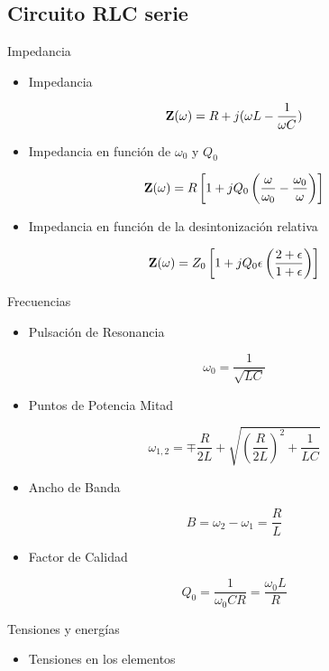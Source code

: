 \subsection{Circuito RLC serie}
\label{sec:org3edc28d}
{Impedancia}

\begin{itemize}
\item Impedancia
\end{itemize}
\[
  \mathbf{Z}(\omega) = R + j(\omega L - \frac{1}{\omega C})
\]
\begin{itemize}
\item Impedancia en función de \(\omega_0\) y \(Q_0\)
\end{itemize}
\[
  \mathbf{Z}(\omega) = R \left[1 + j Q_0 \left(\frac{\omega}{\omega_0} - \frac{\omega_0}{\omega}\right)\right]
\]

\begin{itemize}
\item Impedancia en función de la desintonización relativa
\end{itemize}
\[
  \mathbf{Z}(\omega) = Z_0 \left[ 1 + j Q_0 \epsilon\left(\frac{2 + \epsilon}{1 + \epsilon}\right)\right]
\]  

{Frecuencias}

\begin{itemize}
\item Pulsación de Resonancia
\end{itemize}
\[
  \omega_0 = \frac{1}{\sqrt{LC}}
\]
\begin{itemize}
\item Puntos de Potencia Mitad
\end{itemize}
\[
\omega_{1,2}= \mp \frac{R}{2L} + \sqrt{\left(\frac{R}{2L}\right)^2 + \frac{1}{LC}}
\]

\begin{itemize}
\item Ancho de Banda
\end{itemize}
\[
B = \omega_2 - \omega_1 = \frac{R}{L}
\]

\begin{itemize}
\item Factor de Calidad
\end{itemize}
\[
  Q_0 = \frac{1}{\omega_0 C R} = \frac{\omega_0 L}{R}
\]

{Tensiones y energías}


\begin{itemize}
\item Tensiones en los elementos
\end{itemize}

